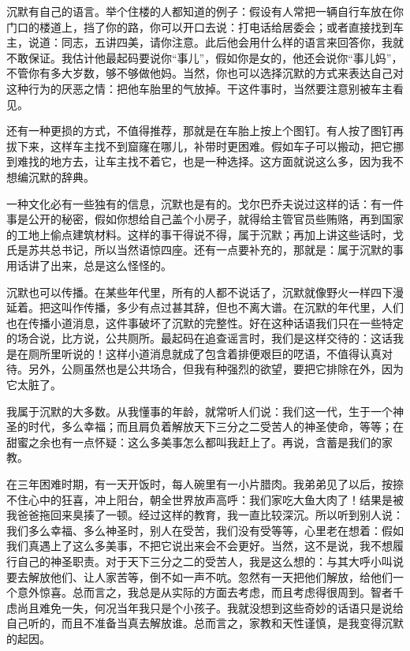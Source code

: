 沉默有自己的语言。举个住楼的人都知道的例子：假设有人常把一辆自行车放在你门口的楼道上，挡了你的路，你可以开口去说：打电话给居委会；或者直接找到车主，说道：同志，五讲四美，请你注意。此后他会用什么样的语言来回答你，我就不敢保证。我估计他最起码要说你“事儿”，假如你是女的，他还会说你“事儿妈”，不管你有多大岁数，够不够做他妈。当然，你也可以选择沉默的方式来表达自己对这种行为的厌恶之情：把他车胎里的气放掉。干这件事时，当然要注意别被车主看见。 


还有一种更损的方式，不值得推荐，那就是在车胎上按上个图钉。有人按了图钉再拔下来，这样车主找不到窟窿在哪儿，补带时更困难。假如车子可以搬动，把它挪到难找的地方去，让车主找不着它，也是一种选择。这方面就说这么多，因为我不想编沉默的辞典。 

一种文化必有一些独有的信息，沉默也是有的。戈尔巴乔夫说过这样的话：有一件事是公开的秘密，假如你想给自己盖个小房子，就得给主管官员些贿赂，再到国家的工地上偷点建筑材料。这样的事干得说不得，属于沉默；再加上讲这些话时，戈氏是苏共总书记，所以当然语惊四座。还有一点要补充的，那就是：属于沉默的事用话讲了出来，总是这么怪怪的。 

沉默也可以传播。在某些年代里，所有的人都不说话了，沉默就像野火一样四下漫延着。把这叫作传播，多少有点过甚其辞，但也不离大谱。在沉默的年代里，人们也在传播小道消息，这件事破坏了沉默的完整性。好在这种话语我们只在一些特定的场合说，比方说，公共厕所。最起码在追查谣言时，我们是这样交待的：这话我是在厕所里听说的！这样小道消息就成了包含着排便艰巨的呓语，不值得认真对待。另外，公厕虽然也是公共场合，但我有种强烈的欲望，要把它排除在外，因为它太脏了。 

我属于沉默的大多数。从我懂事的年龄，就常听人们说：我们这一代，生于一个神圣的时代，多么幸福；而且肩负着解放天下三分之二受苦人的神圣使命，等等；在甜蜜之余也有一点怀疑：这么多美事怎么都叫我赶上了。再说，含蓄是我们的家教。 

在三年困难时期，有一天开饭时，每人碗里有一小片腊肉。我弟弟见了以后，按捺不住心中的狂喜，冲上阳台，朝全世界放声高呼：我们家吃大鱼大肉了！结果是被我爸爸拖回来臭揍了一顿。经过这样的教育，我一直比较深沉。所以听到别人说：我们多么幸福、多么神圣时，别人在受苦，我们没有受等等，心里老在想着：假如我们真遇上了这么多美事，不把它说出来会不会更好。当然，这不是说，我不想履行自己的神圣职责。对于天下三分之二的受苦人，我是这么想的：与其大呼小叫说要去解放他们、让人家苦等，倒不如一声不吭。忽然有一天把他们解放，给他们一个意外惊喜。总而言之，我总是从实际的方面去考虑，而且考虑得很周到。智者千虑尚且难免一失，何况当年我只是个小孩子。我就没想到这些奇妙的话语只是说给自己听的，而且不准备当真去解放谁。总而言之，家教和天性谨慎，是我变得沉默的起因。 

